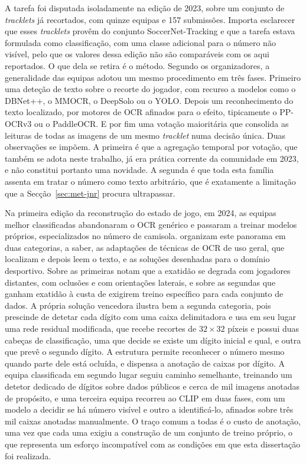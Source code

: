 A tarefa foi disputada isoladamente na edição de 2023, sobre um conjunto de
\emph{tracklets} já recortados, com quinze equipas e 157 submissões. Importa esclarecer
que esses \emph{tracklets} provêm do conjunto SoccerNet-Tracking e que a tarefa estava
formulada como classificação, com uma classe adicional para o número não visível, pelo que
os valores dessa edição não são comparáveis com os aqui reportados. O que dela se retira é
o método. Segundo os organizadores, a generalidade das equipas adotou um mesmo
procedimento em três fases. Primeiro uma deteção de texto sobre o recorte do jogador, com
recurso a modelos como o DBNet++, o MMOCR, o DeepSolo ou o YOLO. Depois um reconhecimento
do texto localizado, por motores de OCR afinados para o efeito, tipicamente o PP-OCRv3 ou
o PaddleOCR. E por fim uma votação maioritária que consolida as leituras de todas as
imagens de um mesmo \emph{tracklet} numa decisão única. Duas observações se impõem. A
primeira é que a agregação temporal por votação, que também se adota neste trabalho, já
era prática corrente da comunidade em 2023, e não constitui portanto uma novidade. A
segunda é que toda esta família assenta em tratar o número como texto arbitrário, que é
exatamente a limitação que a Secção~\ref{sec:met-jnr} procura ultrapassar.

Na primeira edição da reconstrução do estado de jogo, em 2024, as equipas melhor
classificadas abandonaram o OCR genérico e passaram a treinar modelos próprios,
especializados no número de camisola. \citet{golovkin2025minimap} organizam este panorama
em duas categorias, a saber, as adaptações de técnicas de OCR de uso geral, que localizam
e depois leem o texto, e as soluções desenhadas para o domínio desportivo. Sobre as
primeiras notam que a exatidão se degrada com jogadores distantes, com oclusões e com
orientações laterais, e sobre as segundas que ganham exatidão à custa de exigirem treino
específico para cada conjunto de dados. A própria solução vencedora ilustra bem a segunda
categoria, pois prescinde de detetar cada dígito com uma caixa delimitadora e usa em seu
lugar uma rede residual modificada, que recebe recortes de $32\times32$ píxeis e possui
duas cabeças de classificação, uma que decide se existe um dígito inicial e qual, e outra
que prevê o segundo dígito. A estrutura permite reconhecer o número mesmo quando parte
dele está ocluída, e dispensa a anotação de caixas por dígito. A equipa classificada em
segundo lugar seguiu caminho semelhante, treinando um detetor dedicado de dígitos sobre
dados públicos e cerca de mil imagens anotadas de propósito, e uma terceira equipa
recorreu ao CLIP em duas fases, com um modelo a decidir se há número visível e outro a
identificá-lo, afinados sobre três mil caixas anotadas manualmente. O traço comum a todas
é o custo de anotação, uma vez que cada uma exigiu a construção de um conjunto de treino
próprio, o que representa um esforço incompatível com as condições em que esta dissertação
foi realizada.

